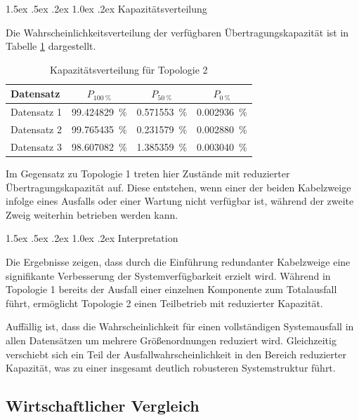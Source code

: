 \documentclass[a4paper,12pt]{article}
\makeatletter
\renewcommand\paragraph{\@startsection{paragraph}{4}{\z@}%
	{1.5ex \@plus .5ex \@minus .2ex}%
	{1.0ex \@plus .2ex}%
	{\normalfont\normalsize\bfseries}}%
\makeatother
\begin{document}
\paragraph{Kapazitätsverteilung}

Die Wahrscheinlichkeitsverteilung der verfügbaren Übertragungskapazität
ist in Tabelle \ref{tab:topo2_capacity} dargestellt.

\begin{table}[h]
\centering
\begin{tabular}{lccc}
\hline
Datensatz & $P_{\qty{100}{\percent}}$ & $P_{\qty{50}{\percent}}$ & $P_{\qty{0}{\percent}}$ \\
\hline
Datensatz 1 & \qty{99.424829}{\percent} & \qty{0.571553}{\percent} & \qty{0.002936}{\percent} \\
Datensatz 2 & \qty{99.765435}{\percent}& \qty{0.231579}{\percent}& \qty{0.002880}{\percent}\\
Datensatz 3 & \qty{98.607082}{\percent} & \qty{1.385359}{\percent} & \qty{0.003040}{\percent}\\
\hline
\end{tabular}
\caption{Kapazitätsverteilung für Topologie 2}
\label{tab:topo2_capacity}
\end{table}

Im Gegensatz zu Topologie 1 treten hier Zustände mit reduzierter
Übertragungskapazität auf. Diese entstehen, wenn einer der beiden
Kabelzweige infolge eines Ausfalls oder einer Wartung nicht verfügbar
ist, während der zweite Zweig weiterhin betrieben werden kann.

\paragraph{Interpretation}

Die Ergebnisse zeigen, dass durch die Einführung redundanter
Kabelzweige eine signifikante Verbesserung der Systemverfügbarkeit
erzielt wird. Während in Topologie 1 bereits der Ausfall einer einzelnen
Komponente zum Totalausfall führt, ermöglicht Topologie 2 einen
Teilbetrieb mit reduzierter Kapazität.

Auffällig ist, dass die Wahrscheinlichkeit für einen vollständigen
Systemausfall in allen Datensätzen um mehrere Größenordnungen reduziert
wird. Gleichzeitig verschiebt sich ein Teil der Ausfallwahrscheinlichkeit
in den Bereich reduzierter Kapazität, was zu einer insgesamt deutlich
robusteren Systemstruktur führt.

\subsection{Wirtschaftlicher Vergleich}
\end{document}
